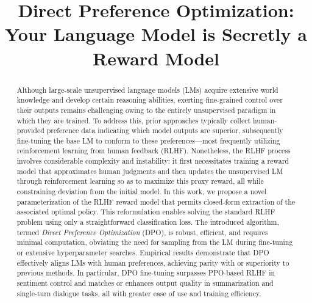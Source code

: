 \title{Direct Preference Optimization: Your Language Model is Secretly a Reward Model}

\begin{abstract}
Although large-scale unsupervised language models (LMs) acquire extensive world knowledge and develop certain reasoning abilities, exerting fine-grained control over their outputs remains challenging owing to the entirely unsupervised paradigm in which they are trained. To address this, prior approaches typically collect human-provided preference data indicating which model outputs are superior, subsequently fine-tuning the base LM to conform to these preferences—most frequently utilizing reinforcement learning from human feedback (RLHF). Nonetheless, the RLHF process involves considerable complexity and instability: it first necessitates training a reward model that approximates human judgments and then updates the unsupervised LM through reinforcement learning so as to maximize this proxy reward, all while constraining deviation from the initial model. In this work, we propose a novel parameterization of the RLHF reward model that permits closed-form extraction of the associated optimal policy. This reformulation enables solving the standard RLHF problem using only a straightforward classification loss. The introduced algorithm, termed \textit{Direct Preference Optimization} (DPO), is robust, efficient, and requires minimal computation, obviating the need for sampling from the LM during fine-tuning or extensive hyperparameter searches. Empirical results demonstrate that DPO effectively aligns LMs with human preferences, achieving parity with or superiority to previous methods. In particular, DPO fine-tuning surpasses PPO-based RLHF in sentiment control and matches or enhances output quality in summarization and single-turn dialogue tasks, all with greater ease of use and training efficiency.
\end{abstract}

